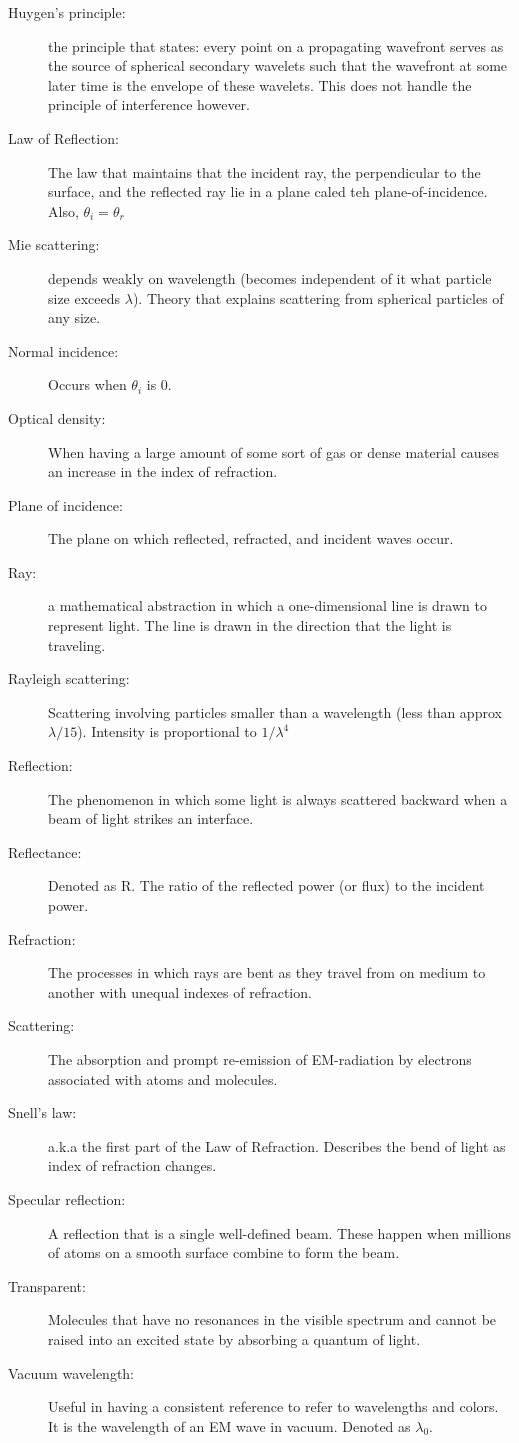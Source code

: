 \documentclass[12pt]{report}
\begin{document}
\begin{description}
\item[Huygen's principle: ] the principle that states: every point on a propagating wavefront serves as the source of spherical secondary wavelets such that the wavefront at some later time is the envelope of these wavelets. This does not handle the principle of interference however. 
\item[Law of Reflection: ] The law that maintains that the incident ray, the perpendicular to the surface, and the reflected ray lie in a plane caled teh plane-of-incidence. Also, $\theta_i = \theta_r$
\item[Mie scattering: ] depends weakly on wavelength (becomes independent of it what particle size exceeds $\lambda$). Theory that explains scattering from spherical particles of any size. 
\item[Normal incidence: ] Occurs when $\theta_i$ is 0.
\item[Optical density: ] When having a large amount of some sort of gas or dense material causes an increase in the index of refraction.
\item[Plane of incidence: ] The plane on which reflected, refracted, and incident waves occur. 
\item[Ray: ] a mathematical abstraction in which a one-dimensional line is drawn to represent light. The line is drawn in the direction that the light is traveling.
\item[Rayleigh scattering: ] Scattering involving particles smaller than a wavelength (less than approx $\lambda/15$). Intensity is proportional to $1/\lambda^4$
\item[Reflection: ] The phenomenon in which some light is always scattered backward when a beam of light strikes an interface. 
\item[Reflectance: ] Denoted as R. The ratio of the reflected power (or flux) to the incident power. 
\item[Refraction: ] The processes in which rays are bent as they travel from on medium to another with  unequal indexes of refraction. 
\item[Scattering: ] The absorption and prompt re-emission of EM-radiation by electrons associated with atoms and molecules. 
\item[Snell's law: ] a.k.a the first part of the Law of Refraction. Describes the bend of light as index of refraction changes. 
\item[Specular reflection: ] A reflection that is a single well-defined beam. These happen when millions of atoms on a smooth surface combine to form the beam.
\item[Transparent: ] Molecules that have no resonances in the visible spectrum and cannot be raised into an excited state by absorbing a quantum of light. 
\item[Vacuum wavelength: ] Useful in having a consistent reference to refer to wavelengths and colors. It is the wavelength of an EM wave in vacuum. Denoted as $\lambda_0$.
\end{description}
\end{document}
